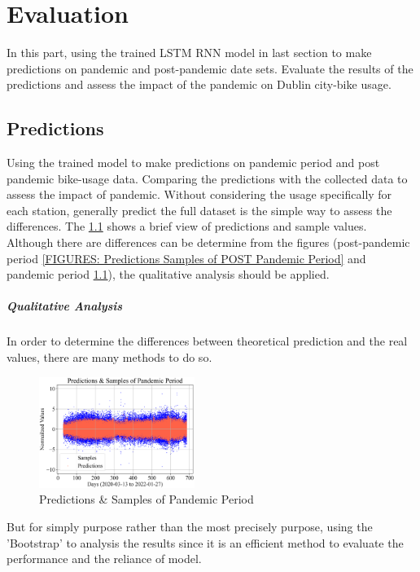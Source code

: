 \chapter{Evaluation}
In this part, using the trained LSTM RNN model in last section to make 
predictions on pandemic and post-pandemic date sets. 
Evaluate the results of the predictions and 
assess the impact of the pandemic on Dublin city-bike usage.
\section{Predictions}
Using the trained model to make predictions on pandemic period and 
post pandemic bike-usage data. 
Comparing the predictions with the collected data to assess the impact of 
pandemic.
Without considering the usage specifically for each station, 
generally predict the full dataset is the simple way to assess the differences.
The \ref{FIGURES: Predictions Samples of Pandemic Period}
shows a brief view of predictions and sample values.
Although there are differences can be determine from the figures 
(post-pandemic period \ref{FIGURES: Predictions Samples of POST Pandemic Period}
and pandemic period \ref{FIGURES: Predictions Samples of Pandemic Period}), 
the qualitative analysis should be applied.

\paragraph{Qualitative Analysis}
In order to determine the differences between theoretical prediction and the 
real values, there are many methods to do so. 
\begin{figure}[H]
    \centering
    \includegraphics[width=0.45\textwidth]{chap/fig5.png}
    \caption{
        \footnotesize 
            Predictions \& Samples of Pandemic Period
        } %
    \label{FIGURES: Predictions Samples of Pandemic Period}
\end{figure}
But for simply purpose rather than the most precisely purpose, 
using the 'Bootstrap' to analysis the results since it is an 
efficient method to evaluate the performance and the reliance of model.

